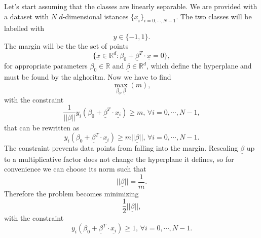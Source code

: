 \documentclass[a4paper]{article}
\begin{document}
Let's start assuming that the classes are linearly separable. We are provided with a dataset with $N$ $d$-dimensional istances $\{\underline{x}_i\}_{i=0,\cdots, N-1}$. The two classes will be labelled with $$y\in \{-1,1\}.$$ The margin will be the the set of points 
\begin{equation}
    \{\underline{x}\in\mathbb{R}^d: \beta_0+\underline{\beta}^T\cdot \underline{x}=0\},
\end{equation}  
for appropriate parameters $\beta_0\in \mathbb{R}$ and $\underline{\beta}\in \mathbb{R}^d$, which define the hyperplane and must be found by the alghoritm. Now we have to find $$\max_{\beta_0, \underline{\beta}}(m),$$ with the constraint 
\begin{equation}
    \frac{1}{||\underline{\beta}||}y_i(\beta_0+\underline{\beta}^T\cdot \underline{x_i})\geq m, \, \forall i=0,\cdots, N-1,
\end{equation}
that can be rewritten as 
\begin{equation}
    y_i(\beta_0+\underline{\beta}^T\cdot \underline{x_i})\geq m||\underline{\beta}||, \, \forall i=0,\cdots, N-1.
\end{equation}
The constraint prevents data points from falling into the margin. Rescaling $\underline{\beta}$ up to a multiplicative factor does not change the hyperplane it defines, so for convenience we can choose its norm such that 
\begin{equation}
    ||\underline{\beta}||=\frac{1}{m}.
\end{equation}
Therefore the problem becomes minimizing
$$\frac{1}{2}||\underline{\beta}||, $$ with the constraint 
\begin{equation}
    y_i(\beta_0+\underline{\beta}^T\cdot \underline{x_i})\geq 1, \, \forall i=0,\cdots, N-1.
\end{equation}
\end{document}
